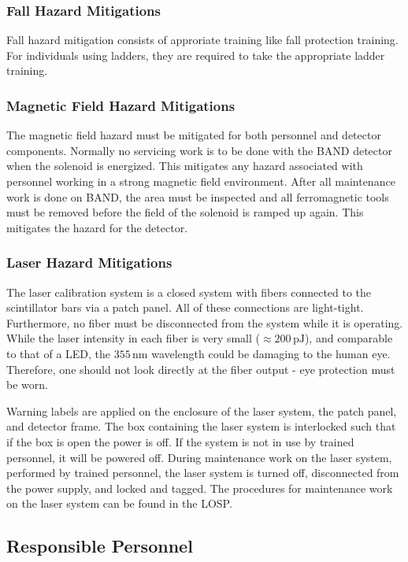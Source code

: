 \subsubsection{Fall Hazard Mitigations} 
Fall hazard mitigation consists of approriate training like fall protection training. For individuals using
ladders, they are required to take the appropriate ladder training.

\subsubsection{Magnetic Field Hazard Mitigations}
The magnetic field hazard must be mitigated for both personnel and detector components. Normally no servicing
work is to be done with the BAND detector when the solenoid is energized.
This mitigates any hazard associated with personnel working in a strong magnetic field environment. 
After all maintenance work is done on BAND, the area must be inspected and all ferromagnetic tools must be
removed before the field of the solenoid is ramped up again. This mitigates the hazard for the detector. 

\subsubsection{Laser Hazard Mitigations}
The laser calibration system is a closed system with fibers connected to the scintillator bars via a patch
panel. All of these connections are light-tight. Furthermore, no fiber must be disconnected from the system
while it is operating. While the laser intensity in each fiber is very small ($\approx 200\,\mathrm{pJ}$),
and comparable to that of a LED, the $355\,\mathrm{nm}$ wavelength could be damaging to the human eye.
Therefore, one should not look directly at the fiber output - eye protection must be worn. 

Warning labels are applied on the enclosure of the laser system, the patch panel, and detector frame. The
box containing the laser system is interlocked such that if the box is open the power is off. If the system
is not in use by trained personnel, it will be powered off. During maintenance work on the laser system,
performed by trained personnel, the laser system is turned off, disconnected from the power supply, and
locked and tagged. The procedures for maintenance work on the laser system can be found in the LOSP.

\subsection{Responsible Personnel}
\indent

